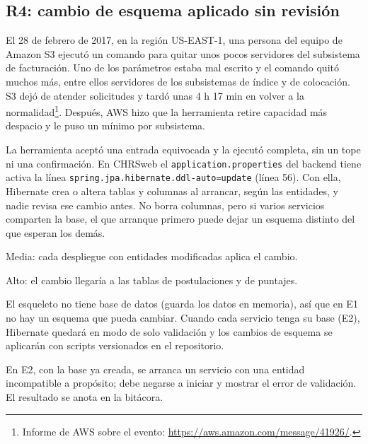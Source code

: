 \subsection{R4: cambio de esquema aplicado sin revisión}

\begin{description}[leftmargin=!,labelwidth=4.2cm,style=nextline]
  \item[Incidente de origen]
    El 28 de febrero de 2017, en la región US-EAST-1, una persona del equipo de Amazon S3 ejecutó un comando para quitar unos pocos servidores del subsistema de facturación. Uno de los parámetros estaba mal escrito y el comando quitó muchos más, entre ellos servidores de los subsistemas de índice y de colocación. S3 dejó de atender solicitudes y tardó unas 4 h 17 min en volver a la normalidad\footnote{Informe de AWS sobre el evento: \url{https://aws.amazon.com/message/41926/}.}. Después, AWS hizo que la herramienta retire capacidad más despacio y le puso un mínimo por subsistema.

  \item[Relación con el SSDC]
    La herramienta aceptó una entrada equivocada y la ejecutó completa, sin un tope ni una confirmación. En CHRSweb el \texttt{application.properties} del backend tiene activa la línea \texttt{spring.jpa.hibernate.ddl-auto=update} (línea 56). Con ella, Hibernate crea o altera tablas y columnas al arrancar, según las entidades, y nadie revisa ese cambio antes. No borra columnas, pero si varios servicios comparten la base, el que arranque primero puede dejar un esquema distinto del que esperan los demás.

  \item[Probabilidad]
    Media: cada despliegue con entidades modificadas aplica el cambio.

  \item[Impacto]
    Alto: el cambio llegaría a las tablas de postulaciones y de puntajes.

  \item[Medida en E1]
    El esqueleto no tiene base de datos (guarda los datos en memoria), así que en E1 no hay un esquema que pueda cambiar. Cuando cada servicio tenga su base (E2), Hibernate quedará en modo de solo validación y los cambios de esquema se aplicarán con scripts versionados en el repositorio.

  \item[Verificación]
    En E2, con la base ya creada, se arranca un servicio con una entidad incompatible a propósito; debe negarse a iniciar y mostrar el error de validación. El resultado se anota en la bitácora.
\end{description}